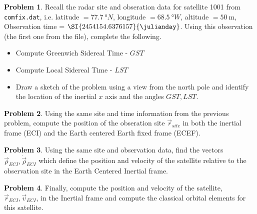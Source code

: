 \documentclass[10pt]{article}
\theoremstyle{definition}
\newtheorem{prob}{Problem}[section]
\begin{document}
\begin{prob}
    Recall the radar site and obseration data for satellite \num{1001} from \texttt{comfix.dat}, i.e. latitude \( = \SI{77.7}{\degree} N\), longitude \( = \SI{68.5}{\degree} W\), altitude \( = \SI{50}{\meter} \), Observation time = \( \SI{ 2454154.6376157}{\julianday}\).
    Using this observation (the first one from the file), complete the following.
    \begin{itemize}
        \item Compute Greenwich Sidereal Time - \( GST \)
        \item Compute Local Sidereal Time - \( LST \)
        \item Draw a sketch of the problem using a view from the north pole and identify the location of the inertial \( x \) axis and the angles \( GST, LST\).
    \end{itemize}
\end{prob}

\begin{prob}
    Using the same site and time information from the previous problem, compute the position of the obseration site \( \vec r_{site} \) in both the inertial frame (ECI) and the Earth centered Earth fixed frame (ECEF).
\end{prob}

\begin{prob}
    Using the same site and observation data, find the vectors \( \vec \rho_{ECI}, \dot \vec \rho_{ECI} \) which define the position and velocity of the satellite relative to the observation site in the Earth Centered Inertial frame.
\end{prob}

\begin{prob}
    Finally, compute the position and velocity of the satellite, \( \vec r_{ECI}, \vec v_{ECI} \), in the Inertial frame and compute the classical orbital elements for this satellite.
\end{prob}
\end{document}
